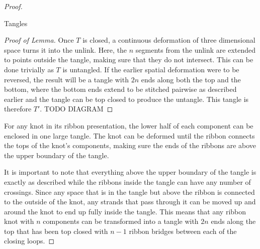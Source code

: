 \begin{paper}
\begin{proof}
\begin{paperlemma}{Tangles}
\end{paperlemma}
\begin{proof}[Proof of Lemma]
Once $T$ is closed, a continuous deformation of three dimensional space turns it
into the unlink.
Here, the $n$ segments from the unlink are extended to points outside the
tangle, making sure that they do not intersect.
This can be done trivially as $T$ is untangled.
If the earlier spatial deformation were to be reversed, the result will be a
tangle with $2n$ ends along both the top and the bottom, where the bottom ends
extend to be stitched pairwise as described earlier and the tangle can be top
closed to produce the untangle.
This tangle is therefore $T'$.
TODO DIAGRAM
\end{proof}
For any knot in its ribbon presentation, the lower half of each component can be
enclosed in one large tangle.
The knot can be deformed until the ribbon connects the tops of the knot's
components, making sure the ends of the ribbons are above the upper boundary of
the tangle.


It is important to note that everything above the upper boundary of the tangle
is exactly as described while the ribbons inside the tangle can have any number
of crossings.
Since any space that is in the tangle but above the ribbon is connected to the
outside of the knot, any strands that pass through it can be moved up and around
the knot to end up fully inside the tangle.
This means that any ribbon knot with $n$ components can be transformed into a
tangle with $2n$ ends along the top that has been top closed with $n-1$ ribbon
bridges between each of the closing loops.



\end{proof}
\end{paper}
